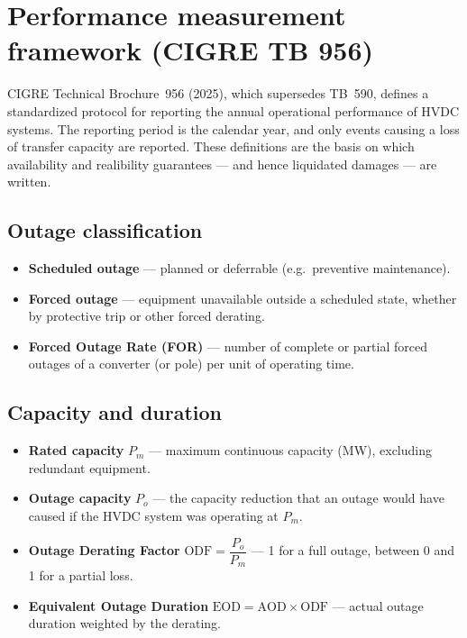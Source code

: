 \section{Performance measurement framework (CIGRE TB 956)}

CIGRE Technical Brochure~956 (2025), which supersedes TB~590, defines a 
standardized protocol for reporting the annual operational performance of HVDC
systems. The reporting period is the calendar year, and only events causing a loss
of transfer capacity are reported. These definitions are the basis on which
availability and realibility guarantees --- and hence liquidated damages --- are written.

\subsection{Outage classification}
\begin{itemize}\setlength{\itemsep}{0.2em}
  \item \textbf{Scheduled outage} --- planned or deferrable (e.g.\ preventive
        maintenance).
  \item \textbf{Forced outage} --- equipment unavailable outside a scheduled
        state, whether by protective trip or other forced derating.
  \item \textbf{Forced Outage Rate (FOR)} --- number of complete or partial
        forced outages of a converter (or pole) per unit of operating time.
\end{itemize}

\subsection{Capacity and duration}
\begin{itemize}\setlength{\itemsep}{0.2em}
  \item \textbf{Rated capacity} $P_m$ --- maximum continuous capacity (MW),
        excluding redundant equipment.
  \item \textbf{Outage capacity} $P_o$ --- the capacity reduction that an outage would have caused if the HVDC system was operating at $P_m$.
  \item \textbf{Outage Derating Factor} $\mathrm{ODF}=\dfrac{P_o}{P_m}$ ---
        1 for a full outage, between 0 and 1 for a partial loss.
  \item \textbf{Equivalent Outage Duration} $\mathrm{EOD}=\mathrm{AOD}\times
        \mathrm{ODF}$ --- actual outage duration weighted by the derating.
\end{itemize}

